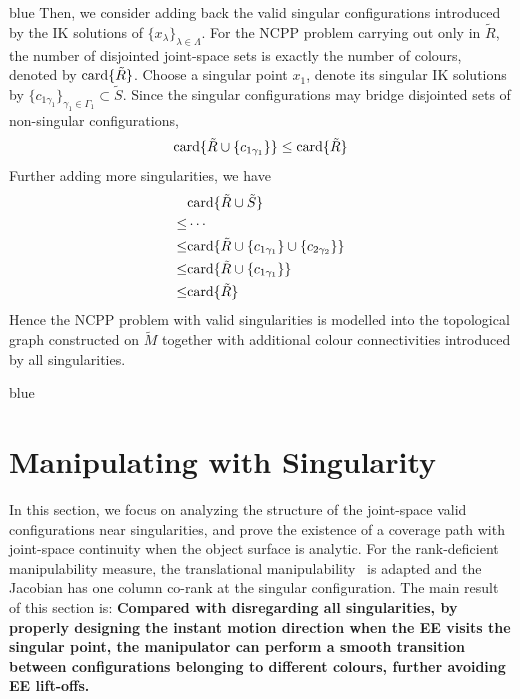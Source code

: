\documentclass[Afour,sageh,times]{sagej}
\begin{document}
\begin{color}{blue}
Then, we consider adding back the valid singular configurations introduced by the IK solutions of $\{x_{\lambda}\}_{\lambda\in\Lambda}$. 
For the NCPP problem carrying out only in $\tilde{R}$, the number of disjointed joint-space sets is exactly the number of colours, denoted by ${\rm card}\{\tilde{R}\}$. 
Choose a singular point $x_{1}$, denote its singular IK solutions by $\{c_{1\gamma_{1}}\}_{\gamma_{1}\in \Gamma_{1}}\subset \tilde{S}$. 
Since the singular configurations may bridge disjointed sets of non-singular configurations, 
\begin{equation}
{\rm card}\{\tilde{R}\cup \{c_{1\gamma_1}\}\}\leq {\rm card}\{\tilde{R}\}
\end{equation}
Further adding more singularities, we have 
\begin{equation}
\begin{aligned}
&{\rm card}\{\tilde{R}\cup \tilde{S}\}\\
\leq & \cdots\\
\leq&{\rm card}\{\tilde{R}\cup \{c_{1\gamma_1}\}\cup \{c_{2\gamma_2}\}\}\\
\leq&{\rm card}\{\tilde{R}\cup \{c_{1\gamma_1}\}\}\\
\leq&{\rm card}\{\tilde{R}\}
\end{aligned}
\end{equation}
Hence the NCPP problem with valid singularities is modelled into the topological graph constructed on $\tilde{M}$ together with additional colour connectivities introduced by all singularities. 
\end{color}

\begin{color}{blue}
\section{Manipulating with Singularity}\label{section_analytic}
\end{color}
In this section, we focus on analyzing the structure of the joint-space valid configurations near singularities, and prove the existence of a coverage path with joint-space continuity when the object surface is analytic. 
For the rank-deficient manipulability measure, the translational manipulability~\cite{yoshikawa1990translational} is adapted and the Jacobian has one column co-rank at the singular configuration. 
The main result of this section is: \textbf{Compared with disregarding all singularities, by properly designing the instant motion direction when the EE visits the singular point, the manipulator can perform a smooth transition between configurations belonging to different colours, further avoiding EE lift-offs. }
\end{document}
